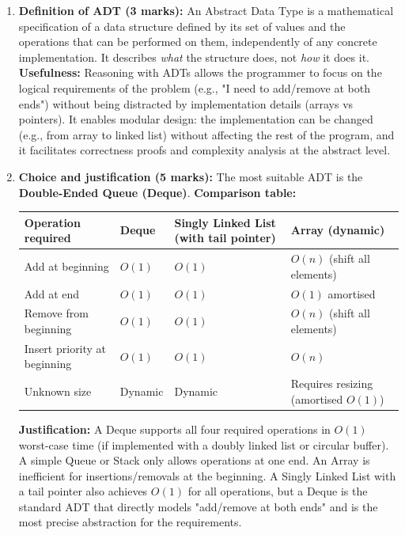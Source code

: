 \documentclass[11pt]{article}
\begin{document}
\begin{corrige}
\begin{enumerate}
\item \textbf{Definition of ADT (3 marks):} An Abstract Data Type is a mathematical specification of a data structure defined by its set of values and the operations that can be performed on them, independently of any concrete implementation. It describes \emph{what} the structure does, not \emph{how} it does it.
\textbf{Usefulness:} Reasoning with ADTs allows the programmer to focus on the logical requirements of the problem (e.g., "I need to add/remove at both ends") without being distracted by implementation details (arrays vs pointers). It enables modular design: the implementation can be changed (e.g., from array to linked list) without affecting the rest of the program, and it facilitates correctness proofs and complexity analysis at the abstract level.

\item \textbf{Choice and justification (5 marks):} The most suitable ADT is the \textbf{Double-Ended Queue (Deque)}.
\textbf{Comparison table:}
\begin{center}
\begin{tabularx}{\linewidth}{|l|X|X|X|}\hline
\rowcolor{popblueL}
\textbf{Operation required} & \textbf{Deque} & \textbf{Singly Linked List (with tail pointer)} & \textbf{Array (dynamic)} \\ \hline
Add at beginning & $O(1)$ & $O(1)$ & $O(n)$ (shift all elements) \\ \hline
Add at end & $O(1)$ & $O(1)$ & $O(1)$ amortised \\ \hline
Remove from beginning & $O(1)$ & $O(1)$ & $O(n)$ (shift all elements) \\ \hline
Insert priority at beginning & $O(1)$ & $O(1)$ & $O(n)$ \\ \hline
Unknown size & Dynamic & Dynamic & Requires resizing (amortised $O(1)$) \\ \hline
\end{tabularx}
\end{center}
\textbf{Justification:} A Deque supports all four required operations in $O(1)$ worst-case time (if implemented with a doubly linked list or circular buffer). A simple Queue or Stack only allows operations at one end. An Array is inefficient for insertions/removals at the beginning. A Singly Linked List with a tail pointer also achieves $O(1)$ for all operations, but a Deque is the standard ADT that directly models "add/remove at both ends" and is the most precise abstraction for the requirements.


\end{enumerate}
\end{corrige}
\end{document}
